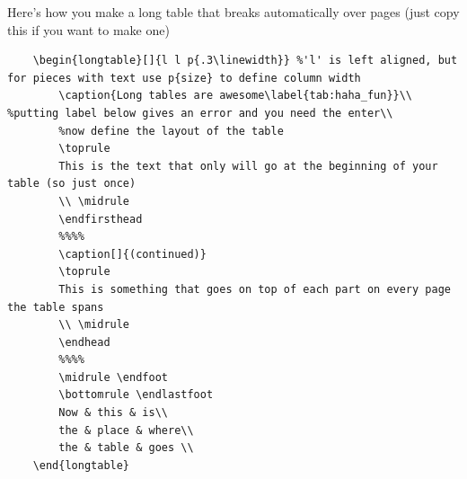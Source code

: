 Here's how you make a long table that breaks automatically over pages (just copy this if you want to make one)
\begin{verbatim}
    \begin{longtable}[]{l l p{.3\linewidth}} %'l' is left aligned, but for pieces with text use p{size} to define column width
        \caption{Long tables are awesome\label{tab:haha_fun}}\\ %putting label below gives an error and you need the enter\\
        %now define the layout of the table
        \toprule
        This is the text that only will go at the beginning of your table (so just once)
        \\ \midrule
        \endfirsthead
        %%%%
        \caption[]{(continued)}
        \toprule
        This is something that goes on top of each part on every page the table spans
        \\ \midrule
        \endhead
        %%%%
        \midrule \endfoot
        \bottomrule \endlastfoot
        Now & this & is\\
        the & place & where\\
        the & table & goes \\
    \end{longtable}
\end{verbatim}

